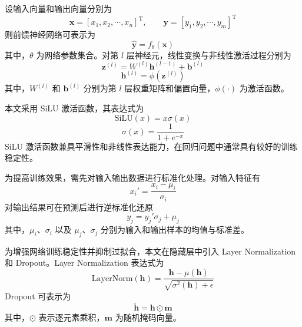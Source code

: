设输入向量和输出向量分别为
\begin{equation}
  \mathbf{x} = [x_1, x_2, \cdots, x_n]^{\mathrm{T}},
  \qquad
  \mathbf{y} = [y_1, y_2, \cdots, y_m]^{\mathrm{T}}
\end{equation}
则前馈神经网络可表示为
\begin{equation}
  \hat{\mathbf{y}} = f_{\theta}(\mathbf{x})
\end{equation}
其中，$\theta$ 为网络参数集合。对第 $l$ 层神经元，线性变换与非线性激活过程分别为
\begin{equation}
  \mathbf{z}^{(l)} = W^{(l)}\mathbf{h}^{(l-1)} + \mathbf{b}^{(l)}
\end{equation}
\begin{equation}
  \mathbf{h}^{(l)} = \phi\left(\mathbf{z}^{(l)}\right)
\end{equation}
其中，$W^{(l)}$ 和 $\mathbf{b}^{(l)}$ 分别为第 $l$ 层权重矩阵和偏置向量，$\phi(\cdot)$ 为激活函数。

本文采用 SiLU 激活函数，其表达式为
\begin{equation}
  \mathrm{SiLU}(x) = x \sigma(x)
\end{equation}
\begin{equation}
  \sigma(x) = \frac{1}{1 + e^{-x}}
\end{equation}
SiLU 激活函数兼具平滑性和非线性表达能力，在回归问题中通常具有较好的训练稳定性\cite{chap4:4}。

为提高训练效果，需先对输入输出数据进行标准化处理。对输入特征有
\begin{equation}
  x_i' = \frac{x_i - \mu_i}{\sigma_i}
\end{equation}
对输出结果可在预测后进行逆标准化还原
\begin{equation}
  y_j = y_j' \sigma_j + \mu_j
\end{equation}
其中，$\mu_i$、$\sigma_i$ 以及 $\mu_j$、$\sigma_j$ 分别为输入和输出样本的均值与标准差。

为增强网络训练稳定性并抑制过拟合，本文在隐藏层中引入 Layer Normalization 和 Dropout。Layer Normalization 表达式为
\begin{equation}
  \mathrm{LayerNorm}(\mathbf{h}) =
  \frac{\mathbf{h} - \mu(\mathbf{h})}
  {\sqrt{\sigma^2(\mathbf{h}) + \epsilon}}
\end{equation}
Dropout 可表示为
\begin{equation}
  \tilde{\mathbf{h}} = \mathbf{h} \odot \mathbf{m}
\end{equation}
其中，$\odot$ 表示逐元素乘积，$\mathbf{m}$ 为随机掩码向量。

